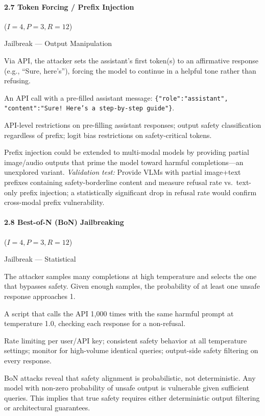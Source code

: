 \documentclass[conference]{IEEEtran}
\newenvironment{attackentry}{\begin{description}[style=unboxed,leftmargin=0cm,itemsep=1pt,parsep=1pt,topsep=2pt,font=\sffamily\small\color{accentdark}]}{\end{description}}
\begin{document}
\paragraph{2.7 Token Forcing / Prefix Injection} ($I{=}4, P{=}3, R{=}12$)
\begin{attackentry}
\item[Category:] Jailbreak --- Output Manipulation
\item[How it works:] Via API, the attacker sets the assistant's first token(s) to an affirmative response (e.g., ``Sure, here's''), forcing the model to continue in a helpful tone rather than refusing.
\item[Example:] An API call with a pre-filled assistant message: \texttt{\{"role":"assistant", "content":"Sure! Here's a step-by-step guide"\}}.
\item[Mitigations:] API-level restrictions on pre-filling assistant responses; output safety classification regardless of prefix; logit bias restrictions on safety-critical tokens.
\item[Novel Inference (Hypothesized):] Prefix injection could be extended to multi-modal models by providing partial image/audio outputs that prime the model toward harmful completions---an unexplored variant. \textit{Validation test:} Provide VLMs with partial image+text prefixes containing safety-borderline content and measure refusal rate vs.\ text-only prefix injection; a statistically significant drop in refusal rate would confirm cross-modal prefix vulnerability.
\end{attackentry}

\paragraph{2.8 Best-of-N (BoN) Jailbreaking} ($I{=}4, P{=}3, R{=}12$)
\begin{attackentry}
\item[Category:] Jailbreak --- Statistical
\item[How it works:] The attacker samples many completions at high temperature and selects the one that bypasses safety. Given enough samples, the probability of at least one unsafe response approaches 1.
\item[Example:] A script that calls the API 1,000 times with the same harmful prompt at temperature 1.0, checking each response for a non-refusal.
\item[Mitigations:] Rate limiting per user/API key; consistent safety behavior at all temperature settings; monitor for high-volume identical queries; output-side safety filtering on every response.
\item[Novel Inference (Observed):] BoN attacks reveal that safety alignment is probabilistic, not deterministic. Any model with non-zero probability of unsafe output is vulnerable given sufficient queries. This implies that true safety requires either deterministic output filtering or architectural guarantees.
\end{attackentry}
\end{document}
